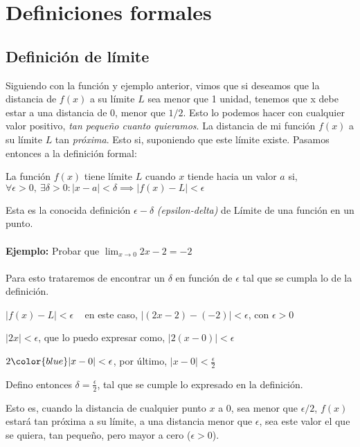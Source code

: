 \documentclass[11pt, a4paper]{article}
\begin{document}
{\section{ Definiciones formales }
\subsection{Definici\'on de l\'imite}
Siguiendo con la funci\'on y ejemplo anterior, vimos que si deseamos que la distancia de $f(x)$ a su l\'imite $L$ sea menor que 1 unidad, tenemos que x debe estar a una distancia de 0, menor que $1/2$. Esto lo podemos hacer con cualquier valor positivo, \textit{tan peque\~no cuanto quieramos}. La distancia de mi funci\'on $f(x)$ a su l\'imite $L$ tan \textit{pr\'oxima}. Esto si, suponiendo que este l\'imite existe. Pasamos entonces a la definici\'on formal: 

\begin{center}
    La funci\'on $f(x)$ tiene l\'imite $L$ cuando $x$ tiende hacia un valor $a$ si, \\ 
    {\color{blue} $ \forall \epsilon >0, ~ \exists \delta >0 : |x-a|<\delta \implies |f(x) - L|< \epsilon $ }
\end{center}
Esta es la conocida definici\'on $\epsilon-\delta$ \textit{(epsilon-delta)} de L\'imite de una funci\'on en un punto.\\ \\
{\color{green}\textbf{Ejemplo:} Probar que $ \displaystyle \lim_{x \to 0} 2x - 2 = -2 $ } \\ \\ 
Para esto trataremos de encontrar un $\delta$ en funci\'on de $\epsilon$ tal que se cumpla lo de la definici\'on. 
\begin{center}
    {\color{blue}$ |f(x) - L | < \epsilon $} ~ en este caso, $ | (2x - 2) - (-2) | < \epsilon $, con $\epsilon>0 $ \\ \hfill
    
    $ | 2x | < \epsilon $, que lo puedo expresar como, $|2(x-0)| < \epsilon $\\ \hfill

    $ 2{\color{blue}|x-0|} < \epsilon $, por \'ultimo, {\color{blue}$|x-0| < \frac{\epsilon}{2}$} \\ \hfill

    Defino entonces {\color{blue}$\delta = \frac{\epsilon}{2}$}, tal que se cumple lo expresado en la  definici\'on.
\end{center}
Esto es, cuando la distancia de cualquier punto $x$ a 0, sea menor que $\epsilon/2$, $f(x)$ estar\'a tan pr\'oxima a su l\'imite, a una distancia menor que $\epsilon$, sea este valor el que se quiera, tan peque\~no, pero mayor a cero ($\epsilon > 0$). 
}
\end{document}
